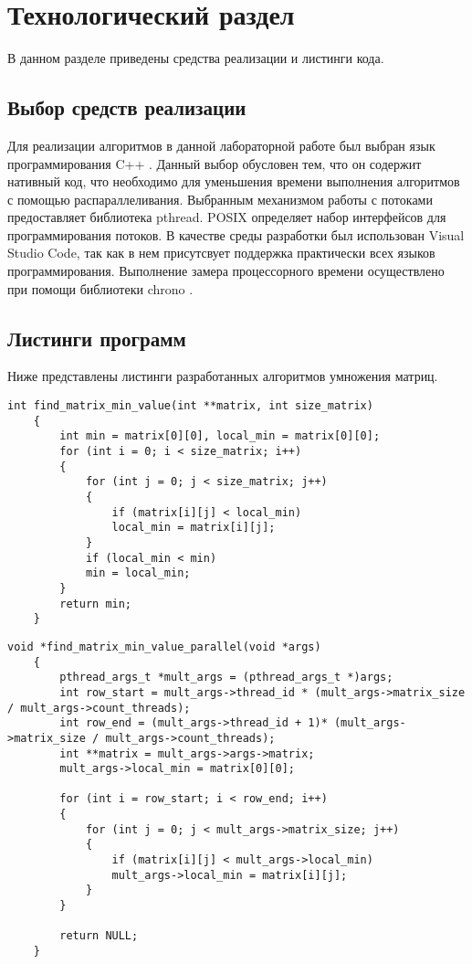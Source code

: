 \chapter{Технологический раздел}
В данном разделе приведены средства реализации и листинги кода.

\section{Выбор средств реализации}
Для реализации алгоритмов в данной лабораторной работе был выбран язык программирования C++ \cite{c++}. Данный выбор обусловен тем, что он содержит нативный код, что необходимо для уменьшения времени выполнения алгоритмов с помощью распараллеливания. Выбранным механизмом работы с потоками предоставляет библиотека pthread. POSIX определяет набор интерфейсов для программирования потоков. В качестве среды разработки был использован Visual Studio Code\cite{vs}, так как в нем присутсвует поддержка практически всех языков программирования. Выполнение замера процессорного времени осуществлено при помощи библиотеки chrono \cite{chrono}.

\section{Листинги программ}
Ниже представлены листинги разработанных алгоритмов умножения матриц.
\newpage
\begin{lstlisting}[label = ordinary_min, caption=Программный код алгоритма нахождения минимума в матрице (последовательная реализация).]
	int find_matrix_min_value(int **matrix, int size_matrix)
	{
		int min = matrix[0][0], local_min = matrix[0][0];
		for (int i = 0; i < size_matrix; i++)
		{
			for (int j = 0; j < size_matrix; j++)
			{
				if (matrix[i][j] < local_min)
				local_min = matrix[i][j];
			}
			if (local_min < min)
			min = local_min;
		}
		return min;
	}
\end{lstlisting}

\begin{lstlisting}[label=vinograd_mult,caption=Программный код алгоритма нахождения минимума в матрице (параллельная реализация).]
	void *find_matrix_min_value_parallel(void *args)
	{
		pthread_args_t *mult_args = (pthread_args_t *)args;
		int row_start = mult_args->thread_id * (mult_args->matrix_size / mult_args->count_threads);
		int row_end = (mult_args->thread_id + 1)* (mult_args->matrix_size / mult_args->count_threads);
		int **matrix = mult_args->args->matrix;
		mult_args->local_min = matrix[0][0];
		
		for (int i = row_start; i < row_end; i++)
		{
			for (int j = 0; j < mult_args->matrix_size; j++)
			{
				if (matrix[i][j] < mult_args->local_min)
				mult_args->local_min = matrix[i][j];
			}
		}
		
		return NULL;
	}
\end{lstlisting}

